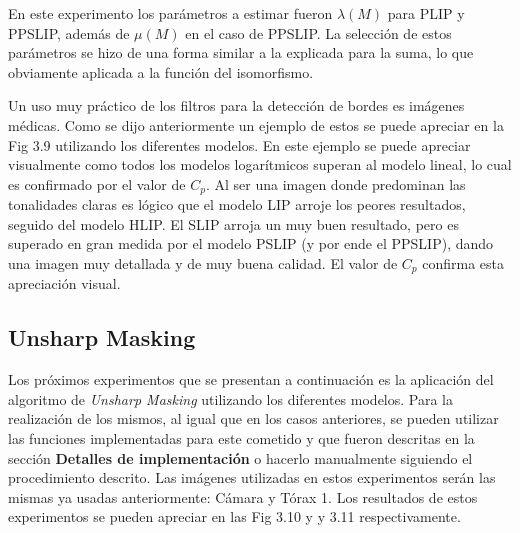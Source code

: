 En este experimento los par\'ametros a estimar fueron $\lambda(M)$ para PLIP y PPSLIP, adem\'as de $\mu(M)$ en el caso de PPSLIP. La selecci\'on de estos par\'ametros se hizo de una forma similar a la explicada para la suma, lo que obviamente aplicada a la funci\'on del isomorfismo.

Un uso muy pr\'actico de los filtros para la detecci\'on de bordes es im\'agenes m\'edicas. Como se dijo anteriormente un ejemplo de estos se puede apreciar en la Fig 3.9 utilizando los diferentes modelos. En este ejemplo se puede apreciar visualmente como todos los modelos logar\'itmicos superan al modelo lineal, lo cual es confirmado por el valor de $C_p$. Al ser una imagen donde predominan las tonalidades claras es l\'ogico que el modelo LIP arroje los peores resultados, seguido del modelo HLIP. El SLIP arroja un muy buen resultado, pero es superado en gran medida por el modelo PSLIP (y por ende el PPSLIP), dando una imagen muy detallada y de muy buena calidad. El valor de $C_p$ confirma esta apreciaci\'on visual.

\subsection{Unsharp Masking}

Los pr\'oximos experimentos que se presentan a continuaci\'on es la aplicaci\'on del algoritmo de \textit{Unsharp Masking} utilizando los diferentes modelos. Para la realizaci\'on de los mismos, al igual que en los casos anteriores, se pueden utilizar las funciones implementadas para este cometido y que fueron descritas en la secci\'on \textbf{Detalles de implementaci\'on} o hacerlo manualmente siguiendo el procedimiento descrito. Las im\'agenes utilizadas en estos experimentos ser\'an las mismas ya usadas anteriormente: C\'amara y T\'orax 1. Los resultados de estos experimentos se pueden apreciar en las Fig 3.10 y y 3.11 respectivamente.

